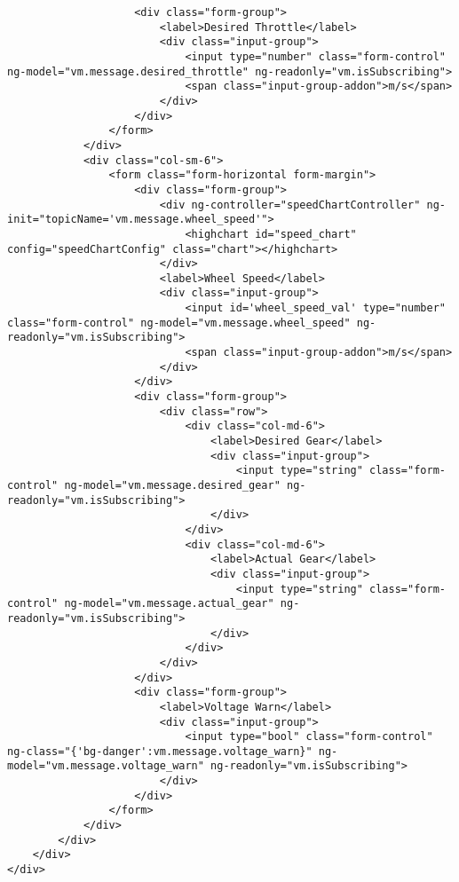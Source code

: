 \begin{verbatim}
                    <div class="form-group">
                        <label>Desired Throttle</label>
                        <div class="input-group">
                            <input type="number" class="form-control" ng-model="vm.message.desired_throttle" ng-readonly="vm.isSubscribing">
                            <span class="input-group-addon">m/s</span>
                        </div>
                    </div>
                </form>
            </div>
            <div class="col-sm-6">
                <form class="form-horizontal form-margin">
                    <div class="form-group">
                        <div ng-controller="speedChartController" ng-init="topicName='vm.message.wheel_speed'">
                            <highchart id="speed_chart" config="speedChartConfig" class="chart"></highchart>
                        </div>
                        <label>Wheel Speed</label>
                        <div class="input-group">
                            <input id='wheel_speed_val' type="number" class="form-control" ng-model="vm.message.wheel_speed" ng-readonly="vm.isSubscribing">
                            <span class="input-group-addon">m/s</span>
                        </div>
                    </div>
                    <div class="form-group">
                        <div class="row">
                            <div class="col-md-6">
                                <label>Desired Gear</label>
                                <div class="input-group">
                                    <input type="string" class="form-control" ng-model="vm.message.desired_gear" ng-readonly="vm.isSubscribing">
                                </div>
                            </div>
                            <div class="col-md-6">
                                <label>Actual Gear</label>
                                <div class="input-group">
                                    <input type="string" class="form-control" ng-model="vm.message.actual_gear" ng-readonly="vm.isSubscribing">
                                </div>
                            </div>
                        </div>
                    </div>
                    <div class="form-group">
                        <label>Voltage Warn</label>
                        <div class="input-group">
                            <input type="bool" class="form-control" ng-class="{'bg-danger':vm.message.voltage_warn}" ng-model="vm.message.voltage_warn" ng-readonly="vm.isSubscribing">
                        </div>
                    </div>
                </form>
            </div>
        </div>
    </div>
</div>
\end{verbatim}






